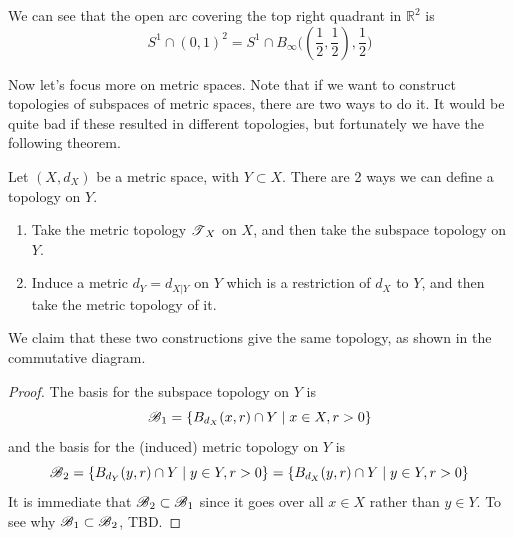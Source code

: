     \begin{example}
      We can see that the open arc covering the top right quadrant in $\mathbb{R}^2$ is 
      \begin{equation}
        S^1 \cap (0, 1)^2 = S^1 \cap B_\infty \big( (\frac{1}{2}, \frac{1}{2}), \frac{1}{2} \big)
      \end{equation}
    \end{example} 

    Now let's focus more on metric spaces. Note that if we want to construct topologies of subspaces of metric spaces, there are two ways to do it. It would be quite bad if these resulted in different topologies, but fortunately we have the following theorem. 

    \begin{theorem}
      Let $(X, d_X)$ be a metric space, with $Y \subset X$. There are 2 ways we can define a topology on $Y$. 
      \begin{enumerate}
        \item Take the metric topology $\T_X$ on $X$, and then take the subspace topology on $Y$. 
        \item Induce a metric $d_Y = d_{X | Y}$ on $Y$ which is a restriction of $d_X$ to $Y$, and then take the metric topology of it. 
      \end{enumerate}
      We claim that these two constructions give the same topology, as shown in the commutative diagram. 

      \begin{figure}[H]
        \centering 
        \caption{} 
        \label{fig:same_construction}
      \end{figure}
    \end{theorem}
    \begin{proof}
      The basis for the subspace topology on $Y$ is 
      \begin{equation}
        \B_1 = \{B_{d_X} (x, r) \cap Y \mid x \in X, r > 0 \}
      \end{equation} 
      and the basis for the (induced) metric topology on $Y$ is 
      \begin{equation}
        \B_2 = \{B_{d_Y} (y, r) \cap Y \mid y \in Y, r > 0 \} = \{B_{d_X} (y, r) \cap Y \mid y \in Y, r > 0 \}
      \end{equation} 
      It is immediate that $\B_2 \subset \B_1$ since it goes over all $x \in X$ rather than $y \in Y$. To see why $\B_1 \subset \B_2$, TBD. 
    \end{proof}


